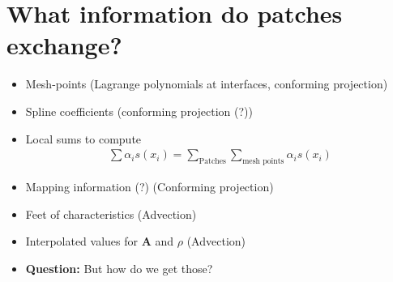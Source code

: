 \documentclass[presentation.tex]{subfiles}
\begin{document}
\section*{What information do patches exchange?}
\begin{itemize}
    \item Mesh-points (Lagrange polynomials at interfaces, 
            conforming projection)
    \item Spline coefficients (conforming projection (?))
    \item Local sums to compute 
            \begin{align*}
                \sum \alpha_i s(x_i) = \sum_{\text{Patches}} 
                        \sum_{\text{mesh points}} \alpha_i s(x_i)
            \end{align*}
    \item Mapping information (?) (Conforming projection)
    \item Feet of characteristics (Advection)
    \item Interpolated values for $\mathbf{A}$ and $\rho$ (Advection)
    \item \textbf{Question:} But how do we get those?
\end{itemize}
\end{document}
